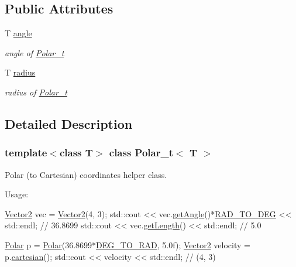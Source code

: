 \subsection*{Public Attributes}
\begin{DoxyCompactItemize}
\item 
\mbox{\label{class_polar__t_a97c5268b13511ac64a7650adc36554cb}} 
T \hyperlink{class_polar__t_a97c5268b13511ac64a7650adc36554cb}{angle}
\begin{DoxyCompactList}\small\item\em angle of \hyperlink{class_polar__t}{Polar\+\_\+t} \end{DoxyCompactList}\item 
\mbox{\label{class_polar__t_a2745dabb07096cd7360d88492e2d7eff}} 
T \hyperlink{class_polar__t_a2745dabb07096cd7360d88492e2d7eff}{radius}
\begin{DoxyCompactList}\small\item\em radius of \hyperlink{class_polar__t}{Polar\+\_\+t} \end{DoxyCompactList}\end{DoxyCompactItemize}


\subsection{Detailed Description}
\subsubsection*{template$<$class T$>$\newline
class Polar\+\_\+t$<$ T $>$}

Polar (to Cartesian) coordinates helper class. 

Usage\+: 
\begin{DoxyCode}
\hyperlink{class_vector_x__t}{Vector2} vec = \hyperlink{vectorx_8h_a599dfa361f200f3bfcf0dbe7aa2cd5ab}{Vector2}(4, 3);
std::cout << vec.\hyperlink{class_vector_x__t_a7e497c0abad76724767e78644ff91e35}{getAngle}()*\hyperlink{vectorx_8h_ad04f332238d224f48f547923ee6d3029}{RAD\_TO\_DEG} << std::endl; \textcolor{comment}{// 36.8699}
std::cout << vec.\hyperlink{class_vector_x__t_aa1548451f4620694a671d9b15be69ba2}{getLength}() << std::endl; \textcolor{comment}{// 5.0}

\hyperlink{class_polar__t}{Polar} p = \hyperlink{vectorx_8h_ae6dadb7c8827f4e57f3a883839948fec}{Polar}(36.8699*\hyperlink{vectorx_8h_aab4087f865137a540e6885dda23341cc}{DEG\_TO\_RAD}, 5.0f);
\hyperlink{class_vector_x__t}{Vector2} velocity = p.\hyperlink{class_polar__t_aa4f91bf6479b2d2cefb22d79de8e1d42}{cartesian}();
std::cout << velocity << std::endl; \textcolor{comment}{// (4, 3)}
\end{DoxyCode}
 

